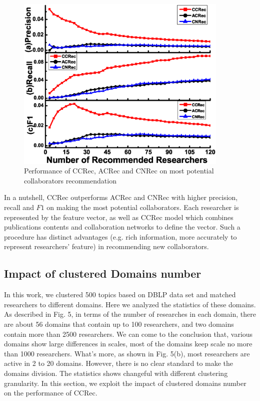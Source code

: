 \documentclass[review]{elsarticle}
\begin{document}
%
\begin{figure}
\centering
\includegraphics [width=4in]{Fig4.eps}
\caption{Performance of CCRec, ACRec and CNRec on most potential collaborators recommendation}
\end{figure}

In a nutshell, CCRec outperforms ACRec and CNRec with higher precision, recall and $F1$ on making the most potential collaborators. Each researcher is represented by the feature vector, as well as CCRec model which combines publications contents and collaboration networks to define the vector. Such a procedure has distinct advantages (e.g. rich information, more accurately to represent researchers' feature) in recommending new collaborators.

\subsection{Impact of clustered Domains number}
In this work, we clustered 500 topics based on DBLP data set and matched researchers to different domains. Here we analyzed the statistics of these domains. As described in Fig. 5, in terms of the number of researches in each domain, there are about 56 domains that contain up to 100 researchers, and two domains contain more than 2500 researchers. We can come to the conclusion that, various domains show large differences in scales, most of the domains keep scale no more than 1000 researchers. What's more, as shown in Fig. 5(b), most researchers are active in 2 to 20 domains. However, there is no clear standard to make the domains division. The statistics shows changeful with different clustering granularity. In this section, we exploit the impact of clustered domains number on the performance of CCRec.
\end{document}
